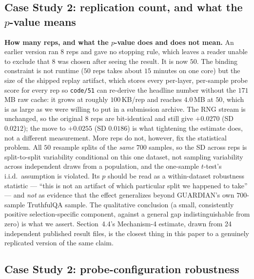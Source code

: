 \documentclass[10pt]{article} %
\begin{document}
\subsection{Case Study 2: replication count, and what the $p$-value means}

\textbf{How many reps, and what the $p$-value does and does not mean.} An
earlier version ran $8$ reps and gave no stopping rule, which leaves a
reader unable to exclude that $8$ was chosen after seeing the result. It is
now $50$. The binding constraint is not runtime ($50$ reps takes about $15$
minutes on one core) but the size of the shipped replay artifact, which
stores every per-layer, per-sample probe score for every rep so
\texttt{code/51} can re-derive the headline number without the $171$\,MB raw
cache: it grows at roughly $100$\,KB/rep and reaches $4.0$\,MB at $50$, which
is as large as we were willing to put in a submission archive. The RNG
stream is unchanged, so the original $8$ reps are bit-identical and still
give $+0.0270$ (SD $0.0212$); the move to $+0.0255$ (SD $0.0186$) is what
tightening the estimate does, not a different measurement. More reps do not,
however, fix the statistical problem. All $50$ resample splits of the
\emph{same} $700$ samples, so the SD across reps is split-to-split
variability conditional on this one dataset, not sampling variability across
independent draws from a population, and the one-sample $t$-test's i.i.d.\
assumption is violated. Its $p$ should be read as a within-dataset
robustness statistic --- ``this is not an artifact of which particular split
we happened to take'' --- and \emph{not} as evidence that the effect
generalizes beyond GUARDIAN's own $700$-sample TruthfulQA sample. The
qualitative conclusion (a small, consistently positive selection-specific
component, against a general gap indistinguishable from zero) is what we
assert. Section~4.4's Mechanism-4 estimate, drawn from 24 independent
published result files, is the closest thing in this paper to a genuinely
replicated version of the same claim.

\subsection{Case Study 2: probe-configuration robustness}
\end{document}
